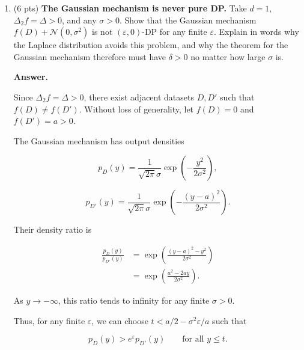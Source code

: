 \documentclass[11pt]{article}
\newcommand{\cA}{\mathcal{A}}
\newcommand{\cN}{\mathcal{N}}
\newcommand{\eps}{\varepsilon}
\newenvironment{answer}{\par\medskip\noindent\textbf{Answer.}\ }{\par\bigskip}
\begin{document}
\begin{enumerate}
\begin{answer}
\[
\Pr(\cA(0)\in S)=\left(\frac12\right)^d,
\]

and

\[
\Pr(\cA(1)\in S)
=\left(\frac12 e^{-\eps/\sqrt d}\right)^d.
\]

Hence,

\[
\frac{\Pr(\cA(0)\in S)}
{\Pr(\cA(1)\in S)}
=e^{\sqrt d\,\eps}.
\]

Therefore, for any $\eps'<\sqrt d\,\eps$,

\[
\Pr(\cA(0)\in S)
>e^{\eps'}\Pr(\cA(1)\in S),
\]

which violates $\eps'$-DP.

Thus, the factor $\sqrt d$ is tight and
cannot be improved in general.

\end{answer}

\item (6 pts) \textbf{The Gaussian mechanism is never pure DP.} Take $d=1$,
$\Delta_2 f=\Delta>0$, and any $\sigma>0$. Show that the Gaussian mechanism
$f(D)+\cN(0,\sigma^2)$ is not $(\eps,0)$-DP for any finite $\eps$. Explain in
words why the Laplace distribution avoids this problem, and why the theorem
for the Gaussian mechanism therefore must have $\delta>0$ no matter how large
$\sigma$ is.

\begin{answer}

Since $\Delta_2 f=\Delta>0$, there exist
adjacent datasets $D,D'$ such that
$f(D)\neq f(D')$.
Without loss of generality, let
$f(D)=0$ and $f(D')=a>0$.

The Gaussian mechanism has output densities

\[
p_D(y)=\frac{1}{\sqrt{2\pi}\sigma}
\exp\left(-\frac{y^2}{2\sigma^2}\right),
\]

\[
p_{D'}(y)=\frac{1}{\sqrt{2\pi}\sigma}
\exp\left(-\frac{(y-a)^2}{2\sigma^2}\right).
\]

Their density ratio is

\[
\begin{aligned}
\frac{p_D(y)}{p_{D'}(y)}
&=\exp\left(
\frac{(y-a)^2-y^2}{2\sigma^2}
\right)\\
&=\exp\left(
\frac{a^2-2ay}{2\sigma^2}
\right).
\end{aligned}
\]

As $y\to-\infty$, this ratio tends to
infinity for any finite $\sigma>0$.

Thus, for any finite $\eps$, we can choose
$t<a/2-\sigma^2\eps/a$ such that

\[
p_D(y)>e^\eps p_{D'}(y)
\qquad \text{for all } y\le t.
\]


\end{answer}
\end{enumerate}
\end{document}
